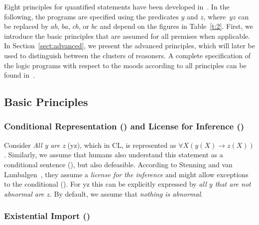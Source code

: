 \documentclass[12pt]{article}
\begin{document}
Eight principles for quantified statements have been developed in~\cite{cogsci:2017,costa:dietz:Hoelldobler:2017,declare:2017}.
In the following, the programs are
specified using the predicates $y$ and $z$, where~$yz$ can be replaced by $ab$, $ba$, $cb$, or $bc$ and depend on the figures in Table~\ref{t:2}. First, we introduce the basic principles that are assumed for all premises when applicable.
In Section~\ref{sect:advanced}, we present the advanced principles, which will 
later be used to distinguish between the clusters of reasoners.
A complete specification of the logic programs with respect to the moods according to all principles can be found in~\cite{declare:2017}.

\subsection{Basic Principles}   \label{sect:basic}

\subsubsection{Conditional Representation (\conditionals) and License for Inference (\licenses)}\label{sect:condli}
Consider \textit{All y are z} ({\MA yz}), which in CL, is represented as $\forall X (y(X) \rightarrow z(X))$.
Similarly, we assume that humans also understand this statement as a conditional sentence (\conditionals),
but also defeasible. According to Stenning and van Lambalgen~\cite{stenning:vanlambalgen:2008}, they assume a \textit{license for the inference} and might allow exceptions to the conditional (\licenses). For \MA yz this can be 
explicitly expressed by 
\textit{all $y$ that are not abnormal are $z$}.
By default, we assume that \textit{nothing is abnormal}. %

\subsubsection{Existential Import ()}
\end{document}
